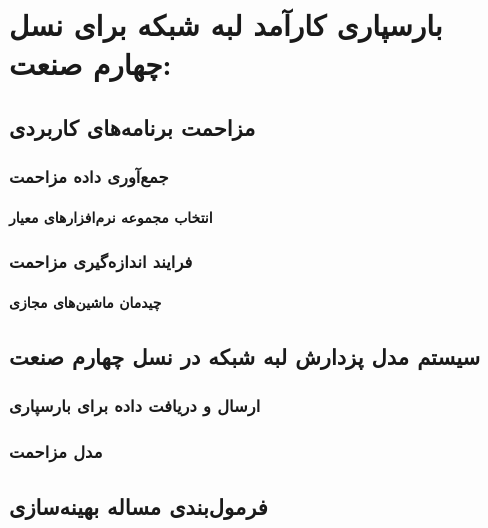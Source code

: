 
\chapter{بارسپاری کارآمد لبه شبکه برای نسل چهارم صنعت:}\label{chap:model}

\section{مزاحمت برنامه‌های کاربردی}

\subsection{جمع‌آوری داده مزاحمت}

\subsubsection{انتخاب مجموعه نرم‌افزارهای معیار}

\subsection{فرایند اندازه‌گیری مزاحمت}

\subsubsection{چیدمان ماشین‌های مجازی}

\section{سیستم مدل پزدارش لبه شبکه در نسل چهارم صنعت}

\subsection{ارسال و دریافت داده برای بارسپاری}

\subsection{مدل مزاحمت}

\section{فرمول‌بندی مساله بهینه‌سازی}

